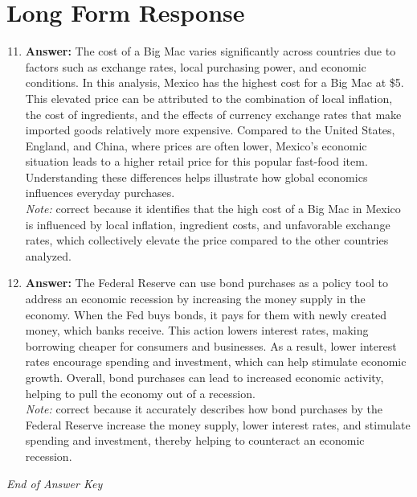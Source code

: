 \documentclass[12pt]{article}
\begin{document}
\section*{Long Form Response}
\begin{enumerate}[label=\arabic*.]
\setcounter{enumi}{10}
\item \textbf{Answer:} The cost of a Big Mac varies significantly across countries due to factors such as exchange rates, local purchasing power, and economic conditions. In this analysis, Mexico has the highest cost for a Big Mac at \$5. This elevated price can be attributed to the combination of local inflation, the cost of ingredients, and the effects of currency exchange rates that make imported goods relatively more expensive. Compared to the United States, England, and China, where prices are often lower, Mexico's economic situation leads to a higher retail price for this popular fast-food item. Understanding these differences helps illustrate how global economics influences everyday purchases.
\\ \textit{Note:} correct because it identifies that the high cost of a Big Mac in Mexico is influenced by local inflation, ingredient costs, and unfavorable exchange rates, which collectively elevate the price compared to the other countries analyzed.
\item \textbf{Answer:} The Federal Reserve can use bond purchases as a policy tool to address an economic recession by increasing the money supply in the economy. When the Fed buys bonds, it pays for them with newly created money, which banks receive. This action lowers interest rates, making borrowing cheaper for consumers and businesses. As a result, lower interest rates encourage spending and investment, which can help stimulate economic growth. Overall, bond purchases can lead to increased economic activity, helping to pull the economy out of a recession.
\\ \textit{Note:} correct because it accurately describes how bond purchases by the Federal Reserve increase the money supply, lower interest rates, and stimulate spending and investment, thereby helping to counteract an economic recession.
\end{enumerate}

\vfill
\noindent\textit{End of Answer Key}
\end{document}

